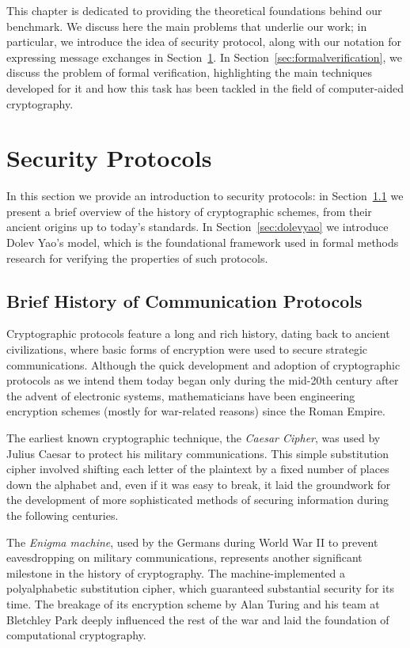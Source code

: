 This chapter is dedicated to providing the theoretical foundations behind our benchmark. We discuss here the main problems that underlie our work; in particular, we introduce the idea of security protocol, along with our notation for expressing message exchanges in Section~\ref{sec:securityprotocols}. In Section~\ref{sec:formalverification}, we discuss the problem of formal verification, highlighting the main techniques developed for it and how this task has been tackled in the field of computer-aided cryptography.


\section{Security Protocols}
\label{sec:securityprotocols}

In this section we provide an introduction to security protocols: in Section~\ref{sec:historyofcommunication} we present a brief overview of the history of cryptographic schemes, from their ancient origins up to today's standards. In Section~\ref{sec:dolevyao} we introduce Dolev Yao's model, which is the foundational framework used in formal methods research for verifying the properties of such protocols.

\subsection{Brief History of Communication Protocols}
\label{sec:historyofcommunication}

Cryptographic protocols feature a long and rich history, dating back to ancient civilizations, where basic forms of encryption were used to secure strategic communications. Although the quick development and adoption of cryptographic protocols as we intend them today began only during the mid-20th century after the advent of electronic systems, mathematicians have been engineering encryption schemes (mostly for war-related reasons) since the Roman Empire.

The earliest known cryptographic technique, the \textit{Caesar Cipher}, was used by Julius Caesar to protect his military communications. This simple substitution cipher involved shifting each letter of the plaintext by a fixed number of places down the alphabet and, even if it was easy to break, it laid the groundwork for the development of more sophisticated methods of securing information during the following centuries.

The \textit{Enigma machine}, used by the Germans during World War II to prevent eavesdropping on military communications, represents another significant milestone in the history of cryptography. The machine-implemented a polyalphabetic substitution cipher, which guaranteed substantial security for its time. The breakage of its encryption scheme by Alan Turing and his team at Bletchley Park deeply influenced the rest of the war and laid the foundation of computational cryptography.

